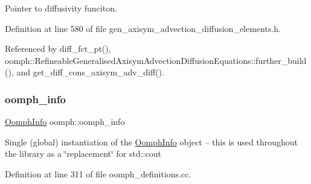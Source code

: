 Pointer to diffusivity funciton. 



Definition at line 580 of file gen\+\_\+axisym\+\_\+advection\+\_\+diffusion\+\_\+elements.\+h.



Referenced by diff\+\_\+fct\+\_\+pt(), oomph\+::\+Refineable\+Generalised\+Axisym\+Advection\+Diffusion\+Equations\+::further\+\_\+build(), and get\+\_\+diff\+\_\+cons\+\_\+axisym\+\_\+adv\+\_\+diff().

\mbox{\label{namespaceoomph_aec474227917784dc0a255faf289cfc16}} 
\subsubsection{\texorpdfstring{oomph\+\_\+info}{oomph\_info}}
{\footnotesize\ttfamily \hyperlink{classoomph_1_1OomphInfo}{Oomph\+Info} oomph\+::oomph\+\_\+info}

Single (global) instantiation of the \hyperlink{classoomph_1_1OomphInfo}{Oomph\+Info} object -- this is used throughout the library as a \char`\"{}replacement\char`\"{} for std\+::cout 

Definition at line 311 of file oomph\+\_\+definitions.\+cc.



